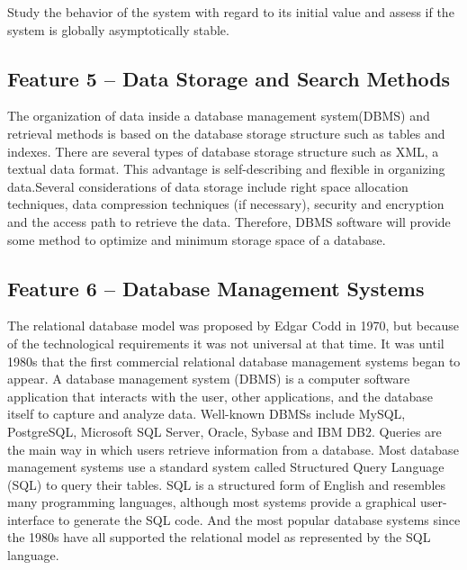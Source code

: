 \documentclass[a4paper]{article} %
\begin{document}
	Study the behavior of the system with regard to its initial value and assess if the system is globally asymptotically stable.
	
	\subsection*{Feature 5 -- Data Storage and Search Methods}
	\label{task1:feature5}
	
	The organization of data inside a database management system(DBMS) and retrieval methods is based on the database storage structure such as tables and indexes. 
	There are several types of database storage structure such as XML, a textual data format. 
	This advantage is self-describing and flexible in organizing data.\cite{ISI:000253400700005}Several considerations of data storage include right space allocation techniques, data compression techniques (if necessary), security and encryption and the access path to retrieve the data. 
	Therefore, DBMS software will provide some method to optimize and  minimum storage space of a database.
	
	\subsection*{Feature 6 -- Database Management Systems}
	\label{task1:feature6}
	
	The relational database model was proposed by Edgar Codd in 1970, but because of the technological requirements it was not universal at that time. It was until 1980s that the first commercial relational database management systems began to appear. 
	A database management system (DBMS) is a computer software application that interacts with the user, other applications, and the database itself to capture and analyze data. Well-known DBMSs include MySQL, PostgreSQL, Microsoft SQL Server, Oracle, Sybase and IBM DB2. 
	Queries are the main way in which users retrieve information from a database. Most database management systems use a standard system called Structured Query Language (SQL) to query their tables. SQL is a structured form of English and resembles many programming languages, although most systems provide a graphical user-interface to generate the SQL code. And the most popular database systems since the 1980s have all supported the relational model as represented by the SQL language.\cite{Martinez-Cruz2011}
	
	
	
	
\end{document}
